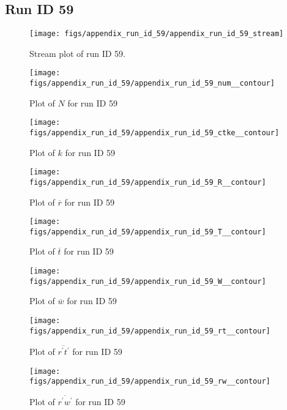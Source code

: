 \subsection{Run ID 59}
\begin{figure}[H]
\centering
\texttt{[image: figs/appendix\_run\_id\_59/appendix\_run\_id\_59\_stream]}
\caption{Stream plot of run ID 59.}
\label{fig:appendix_run_id_59_stream}
\end{figure}


\begin{figure}[H]
\centering
\texttt{[image: figs/appendix\_run\_id\_59/appendix\_run\_id\_59\_num\_\_contour]}
\caption{Plot of $N$ for run ID 59}
\label{fig:appendix_run_id_59_num__contour}
\end{figure}


\begin{figure}[H]
\centering
\texttt{[image: figs/appendix\_run\_id\_59/appendix\_run\_id\_59\_ctke\_\_contour]}
\caption{Plot of $k$ for run ID 59}
\label{fig:appendix_run_id_59_ctke__contour}
\end{figure}


\begin{figure}[H]
\centering
\texttt{[image: figs/appendix\_run\_id\_59/appendix\_run\_id\_59\_R\_\_contour]}
\caption{Plot of $\overline{r}$ for run ID 59}
\label{fig:appendix_run_id_59_R__contour}
\end{figure}


\begin{figure}[H]
\centering
\texttt{[image: figs/appendix\_run\_id\_59/appendix\_run\_id\_59\_T\_\_contour]}
\caption{Plot of $\overline{t}$ for run ID 59}
\label{fig:appendix_run_id_59_T__contour}
\end{figure}


\begin{figure}[H]
\centering
\texttt{[image: figs/appendix\_run\_id\_59/appendix\_run\_id\_59\_W\_\_contour]}
\caption{Plot of $\overline{w}$ for run ID 59}
\label{fig:appendix_run_id_59_W__contour}
\end{figure}


\begin{figure}[H]
\centering
\texttt{[image: figs/appendix\_run\_id\_59/appendix\_run\_id\_59\_rt\_\_contour]}
\caption{Plot of $\overline{r^\prime t^\prime}$ for run ID 59}
\label{fig:appendix_run_id_59_rt__contour}
\end{figure}


\begin{figure}[H]
\centering
\texttt{[image: figs/appendix\_run\_id\_59/appendix\_run\_id\_59\_rw\_\_contour]}
\caption{Plot of $\overline{r^\prime w^\prime}$ for run ID 59}
\label{fig:appendix_run_id_59_rw__contour}
\end{figure}


